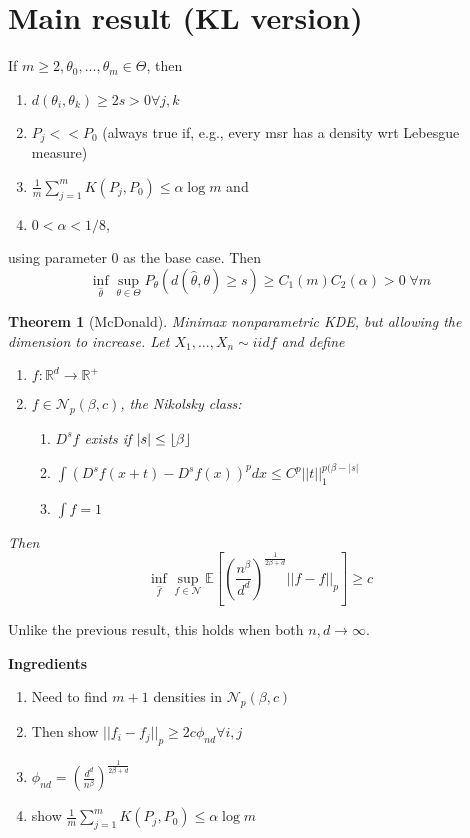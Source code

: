\documentclass[10pt]{article}
\newcounter{lecnum}
\newtheorem{theorem}{Theorem}[lecnum]
\renewcommand{\hat}{\widehat}
\newcommand{\E}[1]{\mathbb{E}\!\left[#1\right]}
\newcommand{\R}{\mathbb{R}}
\newcommand{\N}{\mathcal{N}}
\DeclarePairedDelimiter\floor{\lfloor}{\rfloor}
\begin{document}
\section{Main result (KL version)}
If $m\geq 2, \theta_0,...,\theta_m\in\Theta$, then
\begin{enumerate}
\item $d(\theta_i,\theta_k)\geq2s>0\forall j,k$
\item $P_j<<P_0$ (always true if, e.g., every msr has a density wrt Lebesgue measure)
\item $\frac{1}{m}\sum_{j=1}^mK(P_j,P_0)\leq \alpha\log m$ and 
\item $0<\alpha<1/8$,
\end{enumerate}
using parameter 0 as the base case.  Then \[\inf_{\hat{\theta}}\sup_{\theta\in\Theta} P_\theta(d(\hat{\theta},\theta)\geq s) \geq C_1(m)C_2(\alpha)>0 \;\forall m\]
\begin{theorem}[McDonald]
Minimax nonparametric KDE, but allowing the dimension to increase.
Let $X_1,...,X_n \sim iid f$ and define
\begin{enumerate}
\item $f:\R^d\to\R^+$
\item $f\in\N_p(\beta,c)$, the Nikolsky class: 
\begin{enumerate}
\item $D^s f$ exists if $|s|\leq \floor{\beta}$
\item $\int(D^sf(x+t)-D^sf(x))^pdx \leq C^p||t||_1^{p(\beta-|s|}$
\item $\int f = 1$
\end{enumerate}
\end{enumerate}
Then 
\[
\inf_{ \hat{f} } \sup_{f\in\N} 
	\E{ 
			\left( 
				\frac{n^\beta}{d^d}
			 \right) 
				^ { \frac{1}{2\beta+d}}  
			||f-\hat{f}||_p 
		}
		 \geq c
\]
\end{theorem}

Unlike the previous result, this holds when both $n,d\to\infty$.

\textbf{Ingredients}
\begin{enumerate}
\item Need to find $m+1$ densities in $\N_p(\beta,c)$
\item Then show $||f_i-f_j||_p\geq 2c \phi_{nd} \forall i,j$
\item $\phi_{nd} = (\frac{d^d}{n^\beta})^{\frac{1}{2\beta+d}}$
\item show $\frac{1}{m}\sum_{j=1}^mK(P_j,P_0)\leq \alpha\log m$
\end{enumerate}
\end{document}
